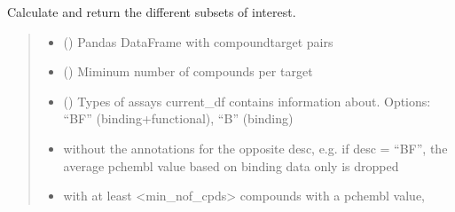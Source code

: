 \documentclass[letterpaper,10pt,english]{sphinxmanual}
\begin{document}
\begin{fulllineitems}
\label{\detokenize{write_subsets:write_subsets.get_data_subsets}}
\pysigstartsignatures
{}
\pysigstopsignatures
\sphinxAtStartPar
Calculate and return the different subsets of interest.
\begin{quote}\begin{description}
\begin{itemize}
\item {} 
\sphinxAtStartPar
{} () \textendash{} Pandas DataFrame with compound\sphinxhyphen{}target pairs

\item {} 
\sphinxAtStartPar
{} () \textendash{} Miminum number of compounds per target

\item {} 
\sphinxAtStartPar
{} () \textendash{} Types of assays current\_df contains information about.         Options: “BF” (binding+functional), “B” (binding)

\end{itemize}

\sphinxAtStartPar
\begin{itemize}
\item {} \begin{description}
\sphinxAtStartPar
without the annotations for the opposite desc,             e.g. if desc = “BF”, the average pchembl value based on
binding data only is dropped

\end{description}

\item {} \begin{description}
\sphinxAtStartPar
with at least \textless{}min\_nof\_cpds\textgreater{} compounds with a pchembl value,


\end{description}
\end{itemize}
\end{description}
\end{quote}
\end{fulllineitems}
\end{document}
